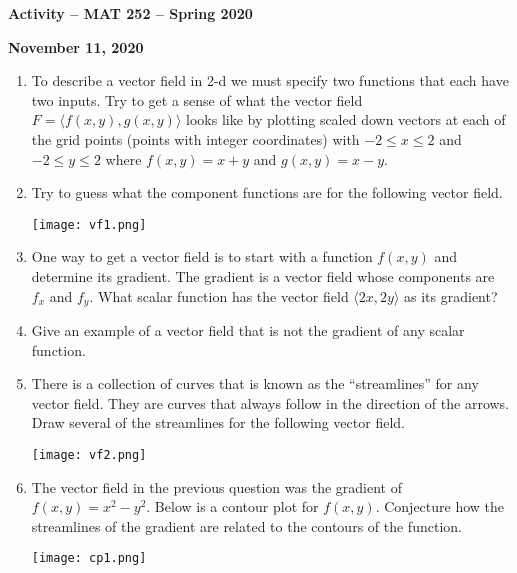\documentclass{amsart}
\begin{document}
\thispagestyle{empty}

\centerline{\Large \bf Activity -- MAT 252 -- Spring 2020}
\bigskip
\centerline{\large \bf November  11, 2020}

\Large

\begin{enumerate}

\item To describe a vector field in 2-d we must specify two functions that each have two inputs.  Try to get a sense of what the vector field $F=\langle f(x,y), g(x,y) \rangle$ looks like by plotting scaled down vectors at each of the grid points (points with integer coordinates) with $-2 \leq x \leq 2$ and $-2 \leq y \leq 2$ where $f(x,y) = x+y$ and $g(x,y) = x-y$.


\vfill

\item Try to guess what the component functions are for the following vector field.

\vspace{.2in}

\texttt{[image: vf1.png]}



\newpage

\item One way to get a vector field is to start with a function $f(x,y)$ and determine its gradient.  The gradient is a vector field whose components are $f_x$ and $f_y$.  What scalar function has the vector field $\langle 2x, 2y \rangle$ as its gradient?

\vfill

\item Give an example of a vector field that is not the gradient of any scalar function.

\vfill

\item There is a collection of curves that is known as the ``streamlines'' for any vector field.  They are curves that always follow in the direction of the arrows.  Draw several of the streamlines for the following vector field.

\vspace{.2in}

\texttt{[image: vf2.png]}

\newpage

\item The vector field in the previous question was the gradient of $f(x,y) = x^2 - y^2$.  Below is a contour plot for $f(x,y)$.  Conjecture how the streamlines of the gradient are related to the contours of the function.

\vspace{.2in}

\texttt{[image: cp1.png]}

\end{enumerate}
\end{document}
